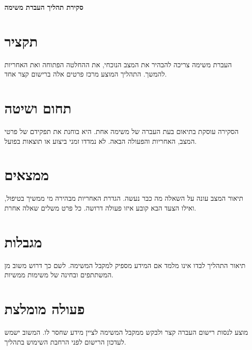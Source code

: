 \def\lakitlanguageprofile{hebrew}
\def\lakitmainlanguage{hebrew}
\def\lakitdocumentclass{article}
\def\lakitclassoptions{11pt,a4paper}
\def\lakitgeometryoptions{margin=2.2cm,headheight=14pt}
\def\lakitlinespread{1.18}
\def\lakitparagraphstyle{block}




{\LARGE\sffamily\bfseries\noindent סקירת תהליך העברת משימה\par}\medskip
\section{תקציר}
העברת משימה צריכה להבהיר את המצב הנוכחי, את ההחלטה הפתוחה ואת האחריות
להמשך. התהליך המוצע מרכז פרטים אלה ברישום קצר אחד.
\section{תחום ושיטה}
הסקירה עוסקת בתיאום בעת העברה של משימה אחת. היא בוחנת את תפקידם של
פרטי המצב, האחריות והפעולה הבאה. לא נמדדו זמני ביצוע או תוצאות בפועל.
\section{ממצאים}
תיאור המצב עונה על השאלה מה כבר נעשה. הגדרת האחריות מבהירה מי ממשיך
בטיפול, ואילו הצעד הבא קובע איזו פעולה דרושה. כל פרט משלים שאלה אחרת.
\section{מגבלות}
תיאור התהליך לבדו אינו מלמד אם המידע מספיק למקבל המשימה. לשם כך דרוש
משוב מן המשתתפים ובחינה של משימות ממשיות.
\section{פעולה מומלצת}
מוצע לנסות רישום העברה קצר ולבקש ממקבל המשימה לציין מידע שחסר לו.
המשוב ישמש לעדכון הרישום לפני הרחבת השימוש בתהליך.


